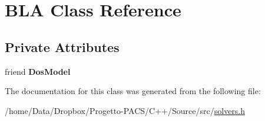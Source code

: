 \hypertarget{classBLA}{\section{B\-L\-A Class Reference}
\label{classBLA}
}
\subsection*{Private Attributes}
\begin{DoxyCompactItemize}
\item 
\hypertarget{classBLA_a2a55a0d03698cf76949ea868d2b8a8b0}{friend {\bfseries Dos\-Model}}\label{classBLA_a2a55a0d03698cf76949ea868d2b8a8b0}

\end{DoxyCompactItemize}


The documentation for this class was generated from the following file\-:\begin{DoxyCompactItemize}
\item 
/home/\-Data/\-Dropbox/\-Progetto-\/\-P\-A\-C\-S/\-C++/\-Source/src/\hyperlink{solvers_8h}{solvers.\-h}\end{DoxyCompactItemize}
